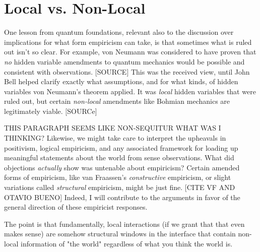 \section{Local vs. Non-Local}

One lesson from quantum foundations, relevant also to the discussion over implications for what form empiricism can take, is that sometimes what is ruled out isn't so clear.  For example, von Neumann was considered to have proven that \emph{no} hidden variable amendments to quantum mechanics would be possible and consistent with observations.  [SOURCE]  This was the received view, until John Bell helped clarify exactly what assumptions, and for what kinds, of hidden variables von Neumann's theorem applied.  It was \emph{local} hidden variables that were ruled out, but certain \emph{non-local} amendments like Bohmian mechanics are legitimately viable.  [SOURCe]


THIS PARAGRAPH SEEMS LIKE NON-SEQUITUR WHAT WAS I THINKING?
Likewise, we might take care to interpret the upheavals in positivism, logical empiricism, and any associated framework for loading up meaningful statements about the world from sense observations.  What did objections \emph{actually} show was untenable about empiricism?  Certain amended forms of empiricism, like van Fraassen's \emph{constructive} empiricism, or slight variations called \emph{structural} empiricism, might be just fine.  [CITE VF AND OTAVIO BUENO]  Indeed, I will contribute to the arguments in favor of the general direction of these empiricist responses. 

The point is that fundamentally, local interactions (if we grant that that even makes sense) are somehow structural windows in the interface that contain non-local information of "the world" regardless of what you think the world is.



